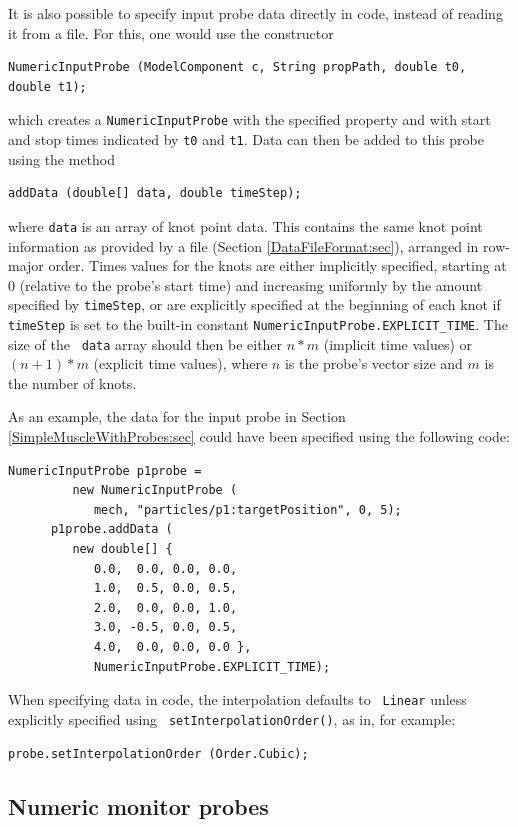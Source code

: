 It is also possible to specify input probe data directly in code,
instead of reading it from a file. For this, one would use the
constructor
%
\begin{lstlisting}[]
   NumericInputProbe (ModelComponent c, String propPath, double t0, double t1);
\end{lstlisting}
%
which creates a {\tt NumericInputProbe} with the specified property
and with start and stop times indicated by {\tt t0} and {\tt t1}.
Data can then be added to this probe using the method
%
\begin{lstlisting}[]
   addData (double[] data, double timeStep);
\end{lstlisting}
%
where {\tt data} is an array of knot point data. This contains the
same knot point information as provided by a file (Section
\ref{DataFileFormat:sec}), arranged in row-major order.  Times values
for the knots are either implicitly specified, starting at 0 (relative
to the probe's start time) and increasing uniformly by the amount
specified by {\tt timeStep}, or are explicitly specified at the
beginning of each knot if {\tt timeStep} is set to the built-in
constant {\tt NumericInputProbe.EXPLICIT\_TIME}. The size of the {\tt
data} array should then be either $n*m$ (implicit time values) or
$(n+1)*m$ (explicit time values), where $n$ is the probe's vector size
and $m$ is the number of knots.

As an example, the data for the input probe in Section
\ref{SimpleMuscleWithProbes:sec} could have been specified
using the following code:
%
\begin{lstlisting}[]
      NumericInputProbe p1probe =
         new NumericInputProbe (
            mech, "particles/p1:targetPosition", 0, 5);
      p1probe.addData (
         new double[] {
            0.0,  0.0, 0.0, 0.0,
            1.0,  0.5, 0.0, 0.5,
            2.0,  0.0, 0.0, 1.0,
            3.0, -0.5, 0.0, 0.5,
            4.0,  0.0, 0.0, 0.0 },
            NumericInputProbe.EXPLICIT_TIME);
\end{lstlisting}

When specifying data in code, the interpolation defaults to {\tt
Linear} unless explicitly specified using {\tt
setInterpolationOrder()}, as in, for example:
%
\begin{lstlisting}[]
   probe.setInterpolationOrder (Order.Cubic);
\end{lstlisting}
%

\subsection{Numeric monitor probes}
\label{NumericMonitorProbes:sec}

